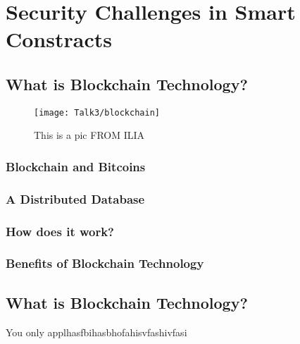 \chapter{Security Challenges in Smart Constracts}


\newpage

\minitoc %

\newpage

\section{What is Blockchain Technology?}
       \begin{figure}[ht]
         \begin{center}
         \texttt{[image: Talk3/blockchain]}
         \end{center}
         \caption{This is a pic FROM ILIA}
         \label{label}
       \end{figure}
       
\subsection{Blockchain and Bitcoins}
\subsection{A Distributed Database}
\subsection{How does it work?}

\subsection{Benefits of Blockchain Technology}
\section{What is Blockchain Technology?}

You only applhasfbihasbhofahisvfashivfasi